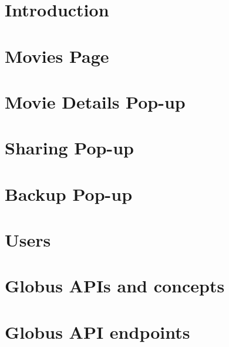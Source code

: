 \documentclass{report}
\begin{document}
\maketitle
\tableofcontents

\chapter{Introduction}


\chapter{Movies Page}


%

\chapter{Movie Details Pop-up}


\chapter{Sharing Pop-up}


\chapter{Backup Pop-up}


\chapter{Users}


\appendix

\chapter{Globus APIs and concepts}


\chapter{Globus API endpoints\label{appendix:globusapis}}

\end{document}
